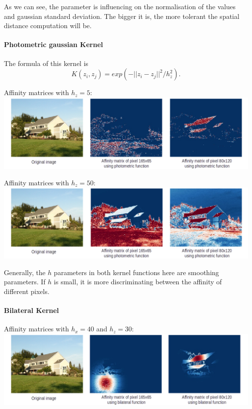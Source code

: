 As we can see, the parameter is influencing on the normalisation of the values and gaussian standard deviation.
The bigger it is, the more tolerant the spatial distance computation will be.

\paragraph{Photometric gaussian Kernel}
The formula of this kernel is
\[K(z_i, z_j) = exp(-||z_i - z_j||^2 / h_z^2).\]

Affinity matrices with \(h_z = 5\): \\
\includegraphics[width=\textwidth]{img/photometricAffinitySigma5.png}

Affinity matrices with \(h_z = 50\): \\
\includegraphics[width=\textwidth]{img/photometricAffinitySigma50.png}

Generally, the \(h\) parameters in both kernel functions here are smoothing parameters.
If \(h\) is small, it is more discriminating between the affinity of different pixels.

\paragraph{Bilateral Kernel}
Affinity matrices with \(h_x = 40\) and \(h_z = 30\): \\
\includegraphics[width=\textwidth]{img/bilateralAffinitySpatial40Photo30.png}

